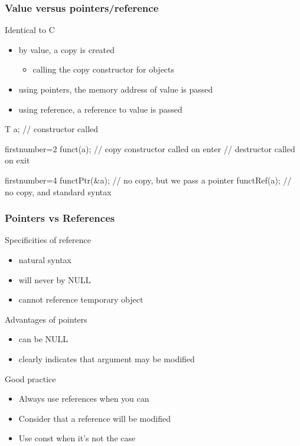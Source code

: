 \begin{frame}[fragile]
  \frametitle{Value versus pointers/reference}
  \begin{block}{Identical to C}
    \begin{itemize}
    \item by value, a copy is created
      \begin{itemize}
        \item calling the copy constructor for objects
      \end{itemize}
    \item using pointers, the memory address of value is passed
    \item using reference, a reference to value is passed
    \end{itemize}
  \end{block}
  \begin{cppcode*}{}
    T a;      // constructor called
  \end{cppcode*}
  \pause
  \begin{cppcode*}{firstnumber=2}
    funct(a); // copy constructor called on enter
              // destructor called on exit
  \end{cppcode*}
  \pause
  \begin{cppcode*}{firstnumber=4}
    functPtr(&a); // no copy, but we pass a pointer
    functRef(a);  // no copy, and standard syntax
  \end{cppcode*}
\end{frame}


\begin{frame}[fragile]
  \frametitle{Pointers vs References}
  \begin{block}{Specificities of reference}
    \begin{itemize}
    \item natural syntax
    \item will never by NULL
    \item cannot reference temporary object
    \end{itemize}
  \end{block}
  \begin{block}{Advantages of pointers}
    \begin{itemize}
    \item can be NULL
    \item clearly indicates that argument may be modified
    \end{itemize}
  \end{block}
  \pause
  \begin{alertblock}{Good practice}
    \begin{itemize}
      \item Always use references when you can
      \item Consider that a reference will be modified
      \item Use const when it's not the case
    \end{itemize}
  \end{alertblock}
\end{frame}

